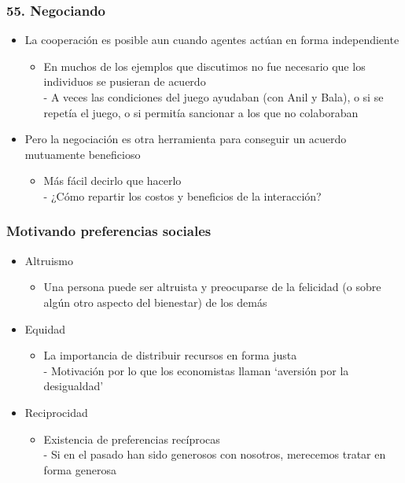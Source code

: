\documentclass{beamer}
\begin{document}
\begin{frame}
\frametitle{55. Negociando}
\begin{itemize}
    \item La cooperación es posible aun cuando agentes 
    actúan en forma independiente
    \begin{itemize}
        \item En muchos de los ejemplos que discutimos no fue necesario que los individuos se pusieran de acuerdo \\
        - A veces las condiciones del juego ayudaban (con Anil y Bala), o si se repetía el juego, o si permitía sancionar a los que no colaboraban
    \end{itemize}
    \item Pero la negociación es otra herramienta para conseguir un acuerdo mutuamente beneficioso
    \begin{itemize}
        \item Más fácil decirlo que hacerlo \\
        - ¿Cómo repartir los costos y beneficios de la interacción?
    \end{itemize}
\end{itemize}
\end{frame}

\begin{frame}
\frametitle{Motivando preferencias sociales}
\begin{itemize}
        \item Altruismo
        \begin{itemize}
            \item Una persona puede ser altruista y preocuparse de la felicidad (o sobre algún otro aspecto del bienestar) de los demás
        \end{itemize}
        \item Equidad
        \begin{itemize}
            \item La importancia de distribuir recursos en forma justa \\
            - Motivación por lo que los economistas llaman `aversión por la desigualdad'
        \end{itemize}
        \item Reciprocidad
        \begin{itemize}
            \item Existencia de preferencias recíprocas \\
            - Si en el pasado han sido generosos con nosotros, merecemos tratar en forma generosa
        \end{itemize}
\end{itemize}
\end{frame}
\end{document}
